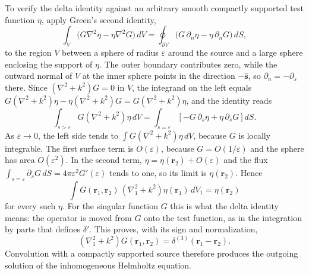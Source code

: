 To verify the delta identity against an arbitrary smooth compactly
supported test function $\eta$, apply Green's second identity,
\[
\int_V\bigl(G\nabla^2\eta-\eta\nabla^2G\bigr)\,dV
=\oint_{\partial V}\bigl(G\,\partial_n\eta-\eta\,\partial_nG\bigr)\,dS,
\]
to the region $V$ between a sphere of radius $\varepsilon$ around the
source and a large sphere enclosing the support of $\eta$. The outer
boundary contributes zero, while the outward normal of $V$ at the
inner sphere points in the direction $-\widehat{\mathbf s}$, so
$\partial_n=-\partial_s$ there. Since $(\nabla^2+k^2)G=0$ in $V$, the
integrand on the left equals
$G(\nabla^2+k^2)\eta-\eta(\nabla^2+k^2)G=G(\nabla^2+k^2)\eta$, and the
identity reads
\[
\int_{s>\varepsilon}G(\nabla^2+k^2)\eta\,dV
=\int_{s=\varepsilon}
\left[-G\,\partial_s\eta+\eta\,\partial_sG\right]dS.
\]
As $\varepsilon\to0$, the left side tends to
$\int G(\nabla^2+k^2)\eta\,dV$, because $G$ is locally integrable.
The first surface term is $O(\varepsilon)$, because $G=O(1/\varepsilon)$
and the sphere has area $O(\varepsilon^2)$. In the second term,
$\eta=\eta(\mathbf r_2)+O(\varepsilon)$ and the flux
$\int_{s=\varepsilon}\partial_sG\,dS=4\pi\varepsilon^2G'(\varepsilon)$
tends to one, so its limit is $\eta(\mathbf r_2)$. Hence
\[
\int G(\mathbf r_1,\mathbf r_2)\,(\nabla_1^2+k^2)\eta(\mathbf r_1)\,dV_1
=\eta(\mathbf r_2)
\]
for every such $\eta$. For the singular function $G$ this is what the
delta identity means: the operator is moved from $G$ onto the test
function, as in the integration by parts that defines $\delta'$. This
proves, with its sign and normalization,
\[
(\nabla_1^2+k^2)G(\mathbf r_1,\mathbf r_2)
=\delta^{(3)}(\mathbf r_1-\mathbf r_2).
\]
Convolution with a compactly supported source therefore produces the
outgoing solution of the inhomogeneous Helmholtz equation.

